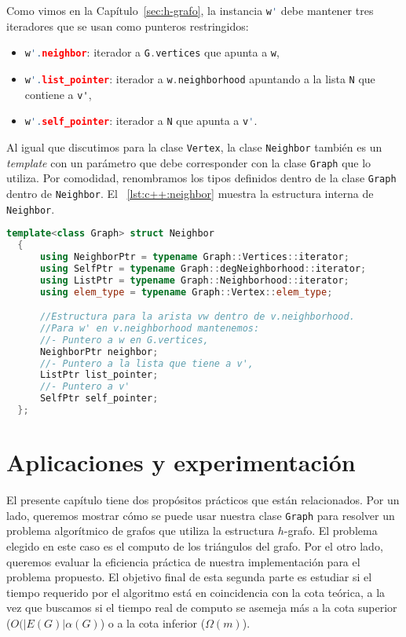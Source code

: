 \documentclass[%
    a4paper,%
    fontsize=12pt,%
    DIV=12,
    twoside,%
    openright,%
    titlepage=true,%
    headsepline,%
    toc=bibliography,%
    parskip=half,%
    cleardoublepage=empty,%
    headings=big,%
]{scrbook}
\makeatletter
\newcommand{\Code}[2][]{\lstinline[basicstyle={\ttfamily},#1]@#2@}
\newcommand{\CPPCode}[2][]{\lstinline[language=C++,basicstyle={\ttfamily},#1]@#2@}
\makeatother
\begin{document}
Como vimos en la Capítulo~\ref{sec:h-grafo}, la instancia \CPPCode{w'} debe mantener tres iteradores que se usan como punteros restringidos:
\begin{itemize}
  \item \CPPCode{w'.neighbor}: iterador a \CPPCode{G.vertices} que apunta a \CPPCode{w},

  \item \CPPCode{w'.list_pointer}: iterador a \CPPCode{w.neighborhood} apuntando a la lista \CPPCode{N} que contiene a \Code{v'},

  \item \CPPCode{w'.self_pointer}: iterador a \CPPCode{N} que apunta a \CPPCode{v'}.
\end{itemize}

Al igual que discutimos para la clase \CPPCode{Vertex}, la clase \CPPCode{Neighbor} también es un \emph{template} con un parámetro que debe corresponder con la clase \CPPCode{Graph} que lo utiliza.  Por comodidad, renombramos los tipos definidos dentro de la clase \CPPCode{Graph} dentro de \CPPCode{Neighbor}.  El \lstlistingname~\ref{lst:c++:neighbor} muestra la estructura interna de \CPPCode{Neighbor}.


\begin{lstlisting}[language={C++},caption={Neighbor.h},gobble=2,float=ht,label={lst:c++:neighbor}]
  template<class Graph> struct Neighbor
  {
      using NeighborPtr = typename Graph::Vertices::iterator;
      using SelfPtr = typename Graph::degNeighborhood::iterator;
      using ListPtr = typename Graph::Neighborhood::iterator;
      using elem_type = typename Graph::Vertex::elem_type;

      //Estructura para la arista vw dentro de v.neighborhood.
      //Para w' en v.neighborhood mantenemos:
      //- Puntero a w en G.vertices, 
      NeighborPtr neighbor;
      //- Puntero a la lista que tiene a v', 
      ListPtr list_pointer;
      //- Puntero a v'
      SelfPtr self_pointer;
  };
\end{lstlisting}

\chapter{Aplicaciones y experimentación}
\label{sec:experimentación}

El presente capítulo tiene dos propósitos prácticos que están relacionados.  Por un lado, queremos mostrar cómo se puede usar nuestra clase \CPPCode{Graph} para resolver un problema algorítmico de grafos que utiliza la estructura $h$-grafo.  El problema elegido en este caso es el computo de los triángulos del grafo.  Por el otro lado, queremos evaluar la eficiencia práctica de nuestra implementación para el problema propuesto.  El objetivo final de esta segunda parte es estudiar si el tiempo requerido por el algoritmo está en coincidencia con la cota teórica, a la vez que buscamos si el tiempo real de computo se asemeja más a la cota superior ($O(|E(G)|\alpha(G)$) o a la cota inferior ($\Omega(m)$).
\end{document}
